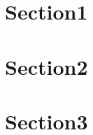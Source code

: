 \documentclass[12pt]{article}
\begin{document}
\tableofcontents
\clearpage
\section{Section1}
\lipsum[4-8]
\newpage
\section*{Section2}
\lipsum[4-8]
\newpage
\section{Section3}
\lipsum[4-8]
\newpage
\lipsum[4-8]
\end{document}
